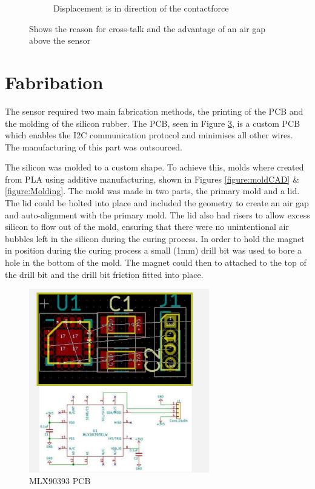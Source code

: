 \begin{figure}
\begin{subfigure}{.45\linewidth}
        \caption{Displacement is in direction of the contactforce}
        \label{label:airgapforce}
    \end{subfigure}
    \label{figure:airgap}
    \caption{Shows the reason for cross-talk and the advantage of an air gap above the sensor}
\end{figure}

\section{Fabribation}
The sensor required two main fabrication methods, the printing of the PCB and the molding of the silicon rubber. The PCB, seen in Figure \ref{fig:PCB}, is a custom PCB which enables the I2C communication protocol and minimises all other wires. The manufacturing of this part was outsourced. 

The silicon was molded to a custom shape. To achieve this, molds where created from PLA using additive manufacturing, shown in Figures \ref{figure:moldCAD} \& \ref{figure:Molding}. The mold was made in two parts, the primary mold and a lid. The lid could be bolted into place and included the geometry to create an air gap and auto-alignment with the primary mold. The lid also had risers to allow excess silicon to flow out of the mold, ensuring that there were no unintentional air bubbles left in the silicon during the curing process. In order to hold the magnet in position during the curing process a small (1mm) drill bit was used to bore a hole in the bottom of the mold. The magnet could then to attached to the top of the drill bit and the drill bit friction fitted into place.

\begin{figure}
    \centering
    \includegraphics[width=0.7\textwidth]{Images/PCB.png}
    \caption{MLX90393 PCB}
    \label{fig:PCB}
\end{figure}

